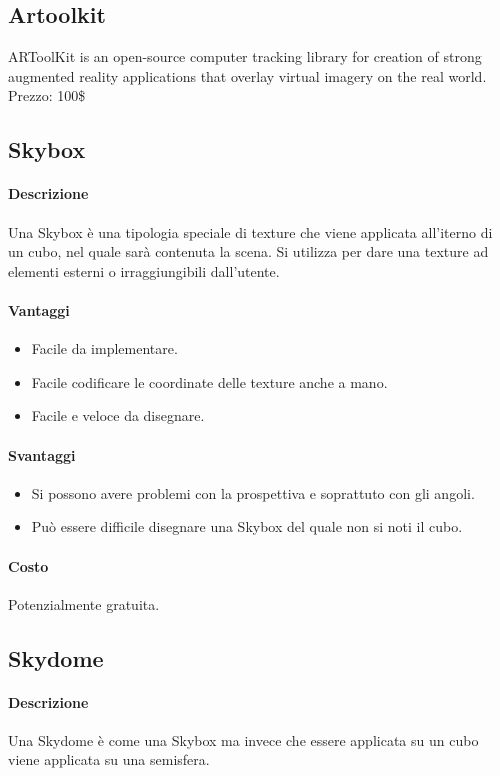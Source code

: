 \documentclass[8pt]{extarticle}
\begin{document}
\begin{multicols}{3}
\subsection{Artoolkit}
ARToolKit is an open-source computer tracking library for creation of strong augmented reality applications that overlay virtual imagery on the real world.
Prezzo: 100\$
\subsection{Skybox}
\paragraph{Descrizione} 
Una Skybox è una tipologia speciale di texture che viene applicata all'iterno di un 
cubo, nel quale sarà contenuta la scena. Si utilizza per dare una texture ad elementi
esterni o irraggiungibili dall'utente. 
\paragraph{Vantaggi}
\begin{itemize}
    \item Facile da implementare.
    \item Facile codificare le coordinate delle texture anche a mano.
    \item Facile e veloce da disegnare.
\end{itemize}
\paragraph{Svantaggi}
\begin{itemize}
    \item Si possono avere problemi con la prospettiva e soprattuto con gli angoli.
    \item Può essere difficile disegnare una Skybox del quale non si noti il cubo.
\end{itemize}
\paragraph{Costo} Potenzialmente gratuita.
\subsection{Skydome}
\paragraph{Descrizione} 
Una Skydome è come una Skybox ma invece che essere applicata su un cubo viene applicata
su una semisfera.

\end{multicols}
\end{document}
